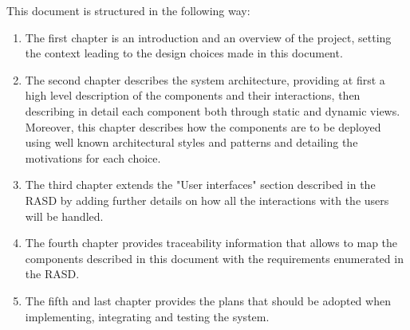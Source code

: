 \documentclass[../../main.tex]{subfiles}
\begin{document}
This document is structured in the following way:

\begin{enumerate}
    \item The  first  chapter  is  an  introduction  and  an  overview  of  the  project,  setting  the  context  leading  to  the design choices made in this document.

    \item The  second  chapter  describes  the  system  architecture,  providing  at  first  a  high  level  description  of  the components  and  their  interactions,  then  describing  in  detail  each  component  both  through  static  and dynamic  views.   Moreover,  this  chapter  describes  how  the  components  are  to  be  deployed  using  well known architectural styles and patterns and detailing the motivations for each choice.


    \item  The third chapter extends the "User interfaces" section described in the RASD by adding further details on how all the interactions with the users will be handled.
    
    \item The fourth chapter provides traceability information that allows to map the components described in this document with the requirements enumerated in the RASD.
    
    \item The fifth and last chapter provides the plans that should be adopted when implementing, integrating and testing the system.
    
\end{enumerate}
\end{document}
